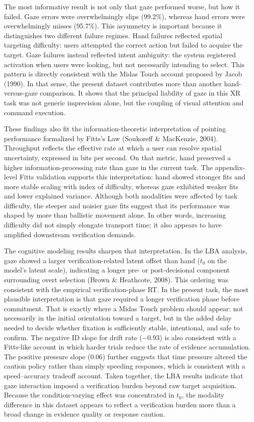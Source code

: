 \documentclass[
  11pt,
  11pt,
  letterpaper]{article}
\begin{document}
The most informative result is not only that gaze performed worse, but
how it failed. Gaze errors were overwhelmingly slips (99.2\%), whereas
hand errors were overwhelmingly misses (95.7\%). This asymmetry is
important because it distinguishes two different failure regimes. Hand
failures reflected spatial targeting difficulty: users attempted the
correct action but failed to acquire the target. Gaze failures instead
reflected intent ambiguity: the system registered activation when users
were looking, but not necessarily intending to select. This pattern is
directly consistent with the Midas Touch account proposed by Jacob
(1990). In that sense, the present dataset contributes more than another
hand-versus-gaze comparison. It shows that the principal liability of
gaze in this XR task was not generic imprecision alone, but the coupling
of visual attention and command execution.

These findings also fit the information-theoretic interpretation of
pointing performance formalized by Fitts's Law (Soukoreff \& MacKenzie,
2004). Throughput reflects the effective rate at which a user can
resolve spatial uncertainty, expressed in bits per second. On that
metric, hand preserved a higher information-processing rate than gaze in
the current task. The appendix-level Fitts validation supports this
interpretation: hand showed stronger fits and more stable scaling with
index of difficulty, whereas gaze exhibited weaker fits and lower
explained variance. Although both modalities were affected by task
difficulty, the steeper and noisier gaze fits suggest that its
performance was shaped by more than ballistic movement alone. In other
words, increasing difficulty did not simply elongate transport time; it
also appears to have amplified downstream verification demands.

The cognitive modeling results sharpen that interpretation. In the LBA
analysis, gaze showed a larger verification-related latent offset than
hand (\(t_0\) on the model's latent scale), indicating a longer pre- or
post-decisional component surrounding overt selection (Brown \&
Heathcote, 2008). This ordering was consistent with the empirical
verification-phase RT. In the present task, the most plausible
interpretation is that gaze required a longer verification phase before
commitment. That is exactly where a Midas Touch problem should appear:
not necessarily in the initial orientation toward a target, but in the
added delay needed to decide whether fixation is sufficiently stable,
intentional, and safe to confirm. The negative ID slope for drift rate
(−0.93) is also consistent with a Fitts-like account in which harder
trials reduce the rate of evidence accumulation. The positive pressure
slope (0.06) further suggests that time pressure altered the caution
policy rather than simply speeding responses, which is consistent with a
speed--accuracy tradeoff account. Taken together, the LBA results
indicate that gaze interaction imposed a verification burden beyond raw
target acquisition. Because the condition-varying effect was
concentrated in \(t_0\), the modality difference in this dataset appears
to reflect a verification burden more than a broad change in evidence
quality or response caution.
\end{document}
